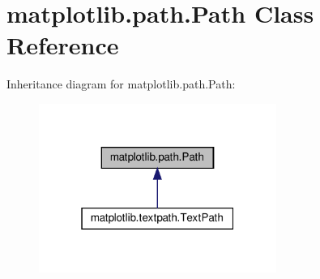 \hypertarget{classmatplotlib_1_1path_1_1Path}{}\section{matplotlib.\+path.\+Path Class Reference}
\label{classmatplotlib_1_1path_1_1Path}


Inheritance diagram for matplotlib.\+path.\+Path\+:
\nopagebreak
\begin{figure}[H]
\begin{center}
\leavevmode
\includegraphics[width=220pt]{classmatplotlib_1_1path_1_1Path__inherit__graph}
\end{center}
\end{figure}
